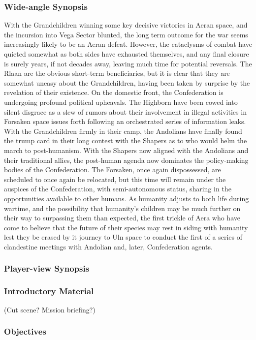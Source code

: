 \subsubsection{Wide-angle Synopsis}
With the Grandchildren winning some key decisive victories in Aeran
space, and the incursion into Vega Sector blunted, the long term
outcome for the war seems increasingly likely to be an Aeran
defeat. However, the cataclysms of combat have quieted somewhat as
both sides have exhausted themselves, and any final closure is surely
years, if not decades away, leaving much time for potential
reversals. The Rlaan are the obvious short-term beneficiaries, but it
is clear that they are somewhat uneasy about the Grandchildren, having
been taken by surprise by the revelation of their existence. On the
domestic front, the Confederation is undergoing profound political
upheavals. The Highborn have been cowed into silent disgrace as a slew
of rumors about their involvement in illegal activities in Forsaken
space issues forth following an orchestrated series of information
leaks. With the Grandchildren firmly in their camp, the Andolians have
finally found the trump card in their long contest with the Shapers as
to who would helm the march to post-humanism. With the Shapers now
aligned with the Andolians and their traditional allies, the
post-human agenda now dominates the policy-making bodies of the
Confederation. The Forsaken, once again dispossessed, are scheduled to
once again be relocated, but this time will remain under the auspices
of the Confederation, with semi-autonomous status, sharing in the
opportunities available to other humans. As humanity adjusts to both
life during wartime, and the possibility that humanity's children may
be much further on their way to surpassing them than expected, the
first trickle of Aera who have come to believe that the future of
their species may rest in siding with humanity lest they be erased by
it journey to Uln space to conduct the first of a series of
clandestine meetings with Andolian and, later, Confederation agents.
\subsubsection{Player-view Synopsis}
\subsubsection{Introductory Material}
 (Cut scene?  Mission briefing?)
\subsubsection{Objectives}
